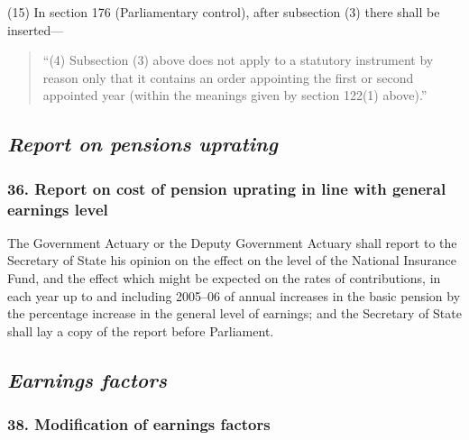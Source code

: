 \documentclass[12pt,a4paper]{article}
\begin{document}
(15) In section 176 (Parliamentary control), after subsection (3)  there shall be inserted—
\begin{quotation}
“(4) Subsection (3)  above does not apply to a statutory instrument by reason only that it contains an order appointing the first or second appointed year (within the meanings given by section 122(1)  above).”
\end{quotation}


\subsection{\itshape Report on pensions uprating}

\subsubsection{36. Report on cost of pension uprating in line with general earnings level}

The Government Actuary or the Deputy Government Actuary shall report to the Secretary of State his opinion on the effect on the level of the National Insurance Fund, and the effect which might be expected on the rates of contributions, in each year up to and including 2005--06 of annual increases in the basic pension by the percentage increase in the general level of earnings; and the Secretary of State shall lay a copy of the report before Parliament.

\subsection{\itshape Earnings factors}

%
%
%
%


\subsubsection{38. Modification of earnings factors}
\end{document}
